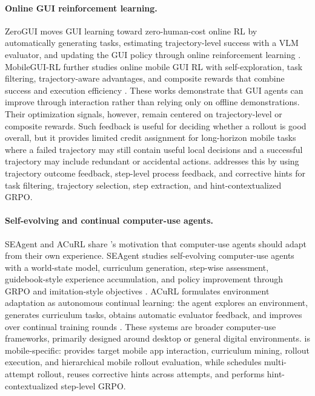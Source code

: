 \paragraph{Online GUI reinforcement learning.}
ZeroGUI moves GUI learning toward zero-human-cost online RL by automatically generating tasks, estimating trajectory-level success with a VLM evaluator, and updating the GUI policy through online reinforcement learning \citep{yang2025zerogui}. MobileGUI-RL further studies online mobile GUI RL with self-exploration, task filtering, trajectory-aware advantages, and composite rewards that combine success and execution efficiency \citep{shi2025mobilegui}. These works demonstrate that GUI agents can improve through interaction rather than relying only on offline demonstrations. Their optimization signals, however, remain centered on trajectory-level or composite rewards. Such feedback is useful for deciding whether a rollout is good overall, but it provides limited credit assignment for long-horizon mobile tasks where a failed trajectory may still contain useful local decisions and a successful trajectory may include redundant or accidental actions. \ourmethod addresses this by using trajectory outcome feedback, step-level process feedback, and corrective hints for task filtering, trajectory selection, step extraction, and hint-contextualized GRPO.

\paragraph{Self-evolving and continual computer-use agents.}
SEAgent and ACuRL share \ourmethod's motivation that computer-use agents should adapt from their own experience. SEAgent studies self-evolving computer-use agents with a world-state model, curriculum generation, step-wise assessment, guidebook-style experience accumulation, and policy improvement through GRPO and imitation-style objectives \citep{sun2025seagent}. ACuRL formulates environment adaptation as autonomous continual learning: the agent explores an environment, generates curriculum tasks, obtains automatic evaluator feedback, and improves over continual training rounds \citep{xue2026acurl}. These systems are broader computer-use frameworks, primarily designed around desktop or general digital environments. \ourmethod is mobile-specific: \mobilegym provides target mobile app interaction, curriculum mining, rollout execution, and hierarchical mobile rollout evaluation, while \hifpo schedules multi-attempt rollout, reuses corrective hints across attempts, and performs hint-contextualized step-level GRPO.

